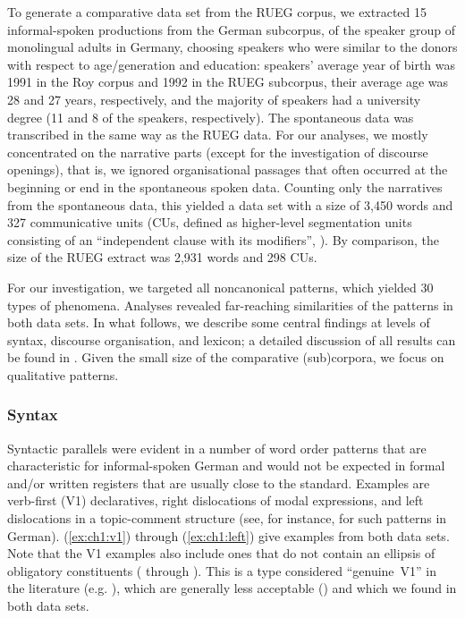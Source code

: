 \documentclass[output=paper,colorlinks,citecolor=brown]{langscibook}
\begin{document}
To generate a comparative data set from the RUEG corpus, we extracted 15 informal-spoken productions from the German subcorpus, of the speaker group of monolingual adults in Germany, choosing speakers who were similar to the donors with respect to age/generation and education: speakers’ average year of birth was 1991 in the Roy corpus and 1992 in the RUEG subcorpus, their average age was 28 and 27 years, respectively, and the majority of speakers had a university degree (11 and 8 of the speakers, respectively). The spontaneous data was transcribed in the same way as the RUEG data.
For our analyses, we mostly concentrated on the narrative parts (except for the investigation of discourse openings), that is, we ignored organisational passages that often occurred at the beginning or end in the spontaneous spoken data. Counting only the narratives from the spontaneous data, this yielded a data set with a size of 3,450 words and 327 communicative units (CUs, defined as higher-level segmentation units consisting of an “independent clause with its modifiers”, \citealt[9]{loban1976}). By comparison, the size of the RUEG extract was 2,931 words and 298 CUs.

For our investigation, we targeted all noncanonical patterns, which yielded 30 types of phenomena. Analyses revealed far-reaching similarities of the patterns in both data sets. In what follows, we describe some central findings at levels of syntax, discourse organisation, and lexicon; a detailed discussion of all results can be found in \citet{roy2022}. Given the small size of the comparative (sub)corpora, we focus on qualitative patterns.

\subsubsection{Syntax} \label{ch1:sec:3.2.2}

Syntactic parallels were evident in a number of word order patterns that are characteristic for informal-spoken German and would not be expected in formal and/or written registers that are usually close to the standard. Examples are verb-first (V1) declaratives, right dislocations of modal expressions, and left dislocations in a topic-comment structure (see, for instance, \citealt{onnerfors1997, imo2014} for such patterns in German). (\ref{ex:ch1:v1}) through (\ref{ex:ch1:left}) give examples from both data sets. Note that the V1 examples also include ones that do not contain an ellipsis of obligatory constituents ( through ). This is a type considered “genuine~V1” in the literature (e.g. \citealt{onnerfors1997}), which are generally less acceptable (\citealt{auer1993}) and which we found in both data sets.
\end{document}
